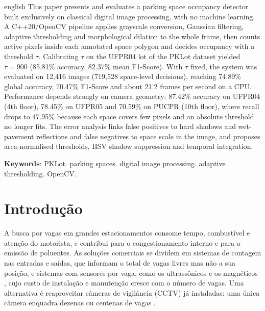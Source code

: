 \documentclass[
	article,			%
	11pt,				%
	oneside,			%
	a4paper,			%
	english,			%
	brazil,				%
	sumario=tradicional
	]{abntex2}
\begin{document}
\renewcommand{\resumoname}{Abstract}
\begin{resumoumacoluna}
\begin{otherlanguage*}{english}
This paper presents and evaluates a parking space occupancy detector built exclusively on classical digital image processing, with no machine learning. A C++20/OpenCV pipeline applies grayscale conversion, Gaussian filtering, adaptive thresholding and morphological dilation to the whole frame, then counts active pixels inside each annotated space polygon and decides occupancy with a threshold $\tau$. Calibrating $\tau$ on the UFPR04 lot of the PKLot dataset yielded $\tau=900$ (85.81\% accuracy, 82.37\% mean F1-Score). With $\tau$ fixed, the system was evaluated on 12,416 images (719,528 space-level decisions), reaching 74.89\% global accuracy, 70.47\% F1-Score and about 21.2 frames per second on a CPU. Performance depends strongly on camera geometry: 87.42\% accuracy on UFPR04 (4th floor), 78.45\% on UFPR05 and 70.59\% on PUCPR (10th floor), where recall drops to 47.95\% because each space covers few pixels and an absolute threshold no longer fits. The error analysis links false positives to hard shadows and wet-pavement reflections and false negatives to space scale in the image, and proposes area-normalised thresholds, HSV shadow suppression and temporal integration.

\vspace{\onelineskip}
\noindent
\textbf{Keywords}: PKLot. parking spaces. digital image processing. adaptive thresholding. OpenCV.
\end{otherlanguage*}
\end{resumoumacoluna}

\textual

\section{Introdução}

A busca por vagas em grandes estacionamentos consome tempo, combustível e atenção do motorista, e contribui para o congestionamento interno e para a emissão de poluentes. As soluções comerciais se dividem em sistemas de contagem nas entradas e saídas, que informam o total de vagas livres mas não a sua posição, e sistemas com sensores por vaga, como os ultrassônicos e os magnéticos \cite{wolff2006magnetic}, cujo custo de instalação e manutenção cresce com o número de vagas. Uma alternativa é reaproveitar câmeras de vigilância (CCTV) já instaladas: uma única câmera enquadra dezenas ou centenas de vagas \cite{almeida2015pklot}.
\end{document}
